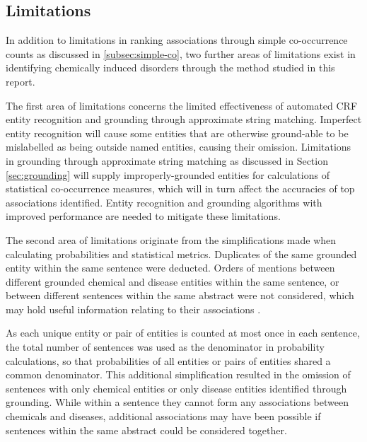 \documentclass[10pt, oneside]{article}
\begin{document}
\subsection{Limitations}

In addition to limitations in ranking associations through simple co-occurrence counts as discussed in \ref{subsec:simple-co}, two further areas of limitations exist in identifying chemically induced disorders through the method studied in this report. 

The first area of limitations concerns the limited effectiveness of automated CRF entity recognition and grounding through approximate string matching. Imperfect entity recognition will cause some entities that are otherwise ground-able to be mislabelled as being outside named entities, causing their omission. Limitations in grounding through approximate string matching as discussed in Section \ref{sec:grounding} will supply improperly-grounded entities for calculations of statistical co-occurrence measures, which will in turn affect the accuracies of top associations identified. Entity recognition and grounding algorithms with improved performance are needed to mitigate these limitations.

The second area of limitations originate from the simplifications made when calculating probabilities and statistical metrics. Duplicates of the same grounded entity within the same sentence were deducted. Orders of mentions between different grounded chemical and disease entities within the same sentence, or between different sentences within the same abstract were not considered, which may hold useful information relating to their associations \cite{galleguillos2008object}. 

As each unique entity or pair of entities is counted at most once in each sentence, the total number of sentences was used as the denominator in probability calculations, so that probabilities of all entities or pairs of entities shared a common denominator. This additional simplification resulted in the omission of sentences with only chemical entities or only disease entities identified through grounding. While within a sentence they cannot form any associations between chemicals and diseases, additional associations may have been possible if sentences within the same abstract could be considered together.


\small{}
\end{document}
